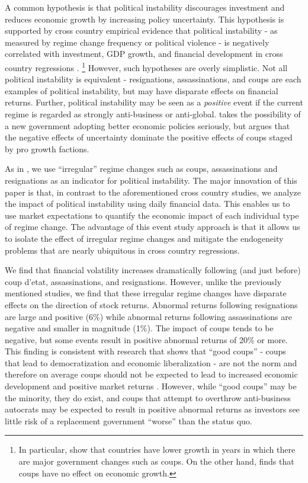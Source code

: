 \documentclass[12pt,final,fleqn]{article}
\theoremstyle{plain}
\begin{document}
A common hypothesis is that political instability discourages investment and reduces economic growth by increasing policy uncertainty. This hypothesis is supported by cross country empirical evidence that political instability - as measured by regime change frequency or political violence - is negatively correlated with investment, GDP growth, and financial development in cross country regressions \citep{alesina1996political,alesina1996income,roe2011political}. \footnote{In particular, \citep{alesina1996political} show that countries have lower growth in years in which there are major government changes such as coups. On the other hand, \citep{londregan1990poverty} finds that coups have no effect on economic growth.} However, such hypotheses are overly simplistic. Not all political instability is equivalent - resignations, assassinations, and coups are each examples of political instability, but may have disparate effects on financial returns. Further, political instability may be seen as a \textit{positive} event if the current regime is regarded as strongly anti-business or anti-global.  \citep{alesina1996political} takes the possibility of a new government adopting better economic policies seriously, but argues that the negative effects of uncertainty dominate the positive effects of coups staged by pro growth factions. 

As in \citep{alesina1996political}, we use ``irregular'' regime changes such as coups, assassinations and resignations as an indicator for political instability. The major innovation of this paper is that, in contrast to the aforementioned cross country studies, we analyze the impact of political instability using daily financial data. This enables us to use market expectations to quantify the economic impact of each individual type of regime change. The advantage of this event study approach is that it allows us to isolate the effect of irregular regime changes and mitigate the endogeneity problems that are nearly ubiquitous in cross country regressions.

We find that financial volatility increases dramatically following (and just before) coup d'etat, assassinations, and resignations. However, unlike the previously mentioned studies, we find that these irregular regime changes have disparate effects on the direction of stock returns. Abnormal returns following resignations are large and positive (6\%) while abnormal returns following assassinations are negative and smaller in magnitude (1\%). The impact of coups tends to be negative, but some events result in positive abnormal returns of 20\% or more. This finding is consistent with research that shows that ``good coups'' - coups that lead to democratization and economic liberalization - are not the norm and therefore on average coups should not be expected to lead to increased economic development and positive market returns \citep{derpanopoulos2015coups}. However, while ``good coups'' may be the minority, they do exist, and coups that attempt to overthrow anti-business autocrats may be expected to result in positive abnormal returns as investors see little risk of a replacement government ``worse'' than the status quo.
\end{document}
